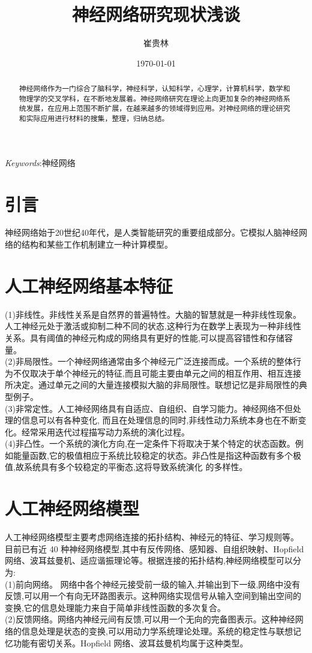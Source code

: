 \documentclass[a4paper,12pt]{article}
\title{神经网络研究现状浅谈}
\author{崔贵林}
\date{\today}
\begin{document}
\begin{CJK*}{UTF8}{gbsn}
	\maketitle
	\begin{abstract}
		神经网络作为一门综合了脑科学，神经科学，认知科学，心理学，计算机科学，数学和物理学的交叉学科，在不断地发展着。神经网络研究在理论上向更加复杂的神经网络系统发展，在应用上范围不断扩展，在越来越多的领域得到应用。对神经网络的理论研究和实际应用进行材料的搜集，整理，归纳总结。
	\end{abstract}
	\emph{Keywords}:神经网络
	\newpage
	\section{引言}
	神经网络始于20世纪40年代，是人类智能研究的重要组成部分。它模拟人脑神经网络的结构和某些工作机制建立一种计算模型。
	\section{人工神经网络基本特征}
	(1)非线性。非线性关系是自然界的普遍特性。大脑的智慧就是一种非线性现象。人工神经元处于激活或抑制二种不同的状态,这种行为在数学上表现为一种非线性关系。具有阈值的神经元构成的网络具有更好的性能,可以提高容错性和存储容量。\\
(2)非局限性。一个神经网络通常由多个神经元广泛连接而成。一个系统的整体行为不仅取决于单个神经元的特征,而且可能主要由单元之间的相互作用、相互连接所决定。通过单元之间的大量连接模拟大脑的非局限性。联想记忆是非局限性的典型例子。\\
(3)非常定性。人工神经网络具有自适应、自组织、自学习能力。神经网络不但处理的信息可以有各种变化,
而且在处理信息的同时,非线性动力系统本身也在不断变化。经常采用迭代过程描写动力系统的演化过程。\\
(4)非凸性。一个系统的演化方向,在一定条件下将取决于某个特定的状态函数。例如能量函数,它的极值相应于系统比较稳定的状态。非凸性是指这种函数有多个极值,故系统具有多个较稳定的平衡态,这将导致系统演化
的多样性。
	\section{人工神经网络模型}
	人工神经网络模型主要考虑网络连接的拓扑结构、神经元的特征、学习规则等。\\
	目前已有近 40 种神经网络模型,其中有反传网络、感知器、自组织映射、Hopfield 网络、波耳兹曼机、适应谐振理论等。根据连接的拓扑结构,神经网络模型可以分为:\\
	(1)前向网络。 网络中各个神经元接受前一级的输入,并输出到下一级,网络中没有反馈,可以用一个有向无环路图表示。这种网络实现信号从输入空间到输出空间的变换,它的信息处理能力来自于简单非线性函数的多次复合。\\
	(2)反馈网络。网络内神经元间有反馈,可以用一个无向的完备图表示。这种神经网络的信息处理是状态的变换,可以用动力学系统理论处理。系统的稳定性与联想记忆功能有密切关系。Hopfield 网络、波耳兹曼机均属于这种类型。


\end{CJK*}
\end{document}
